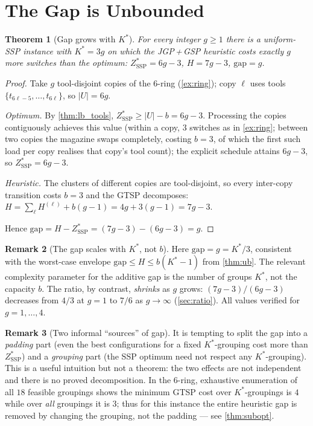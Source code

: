 \documentclass[11pt,a4paper]{article}
\theoremstyle{plain}
\newtheorem{theorem}{Theorem}[section]
\theoremstyle{definition}
\newtheorem{remark}[theorem]{Remark}
\newcommand{\Kstar}{K^{*}}
\newcommand{\ZSSP}{Z_{\mathrm{SSP}}^{*}}
\begin{document}
\section{The Gap is Unbounded}
\label{sec:gap_growth}

\begin{thmbox}
\begin{theorem}[Gap grows with $\Kstar$]
\label{thm:unbounded}
For every integer $g\ge 1$ there is a uniform-SSP instance with $\Kstar=3g$ on which the
JGP\,+\,GSP heuristic costs exactly $g$ more switches than the optimum:
$\ZSSP=6g-3$, $H=7g-3$, $\mathrm{gap}=g$.
\end{theorem}
\end{thmbox}
\begin{proofbox}
\begin{proof}
Take $g$ tool-disjoint copies of the $6$-ring (\cref{ex:ring}); copy $\ell$ uses tools
$\{t_{6\ell-5},\dots,t_{6\ell}\}$, so $|U|=6g$.

\emph{Optimum.} By \cref{thm:lb_tools}, $\ZSSP\ge|U|-b=6g-3$. Processing the copies
contiguously achieves this value (within a copy, $3$ switches as in \cref{ex:ring};
between two copies the magazine swaps completely, costing $b=3$, of which the first such
load per copy realises that copy's tool count); the explicit schedule attains $6g-3$, so
$\ZSSP=6g-3$.

\emph{Heuristic.} The clusters of different copies are tool-disjoint, so every
inter-copy transition costs $b=3$ and the GTSP decomposes: $H=\sum_{\ell}H^{(\ell)}+b(g-1)
=4g+3(g-1)=7g-3$.

Hence $\mathrm{gap}=H-\ZSSP=(7g-3)-(6g-3)=g$.
\end{proof}
\end{proofbox}

\begin{remark}[The gap scales with $\Kstar$, not $b$]
Here $\mathrm{gap}=g=\Kstar/3$, consistent with the worst-case envelope
$\mathrm{gap}\le H\le b(\Kstar-1)$ from \cref{thm:ub}. The relevant complexity
parameter for the additive gap is the number of groups $\Kstar$, not the capacity $b$.
The ratio, by contrast, \emph{shrinks} as $g$ grows: $(7g-3)/(6g-3)$ decreases from
$4/3$ at $g=1$ to $7/6$ as $g\to\infty$ (\cref{sec:ratio}). All values verified for
$g=1,\dots,4$.
\end{remark}

\begin{remark}[Two informal ``sources'' of gap]
\label{rem:sources}
It is tempting to split the gap into a \emph{padding} part (even the best configurations
for a fixed $\Kstar$-grouping cost more than $\ZSSP$) and a \emph{grouping} part (the SSP
optimum need not respect any $\Kstar$-grouping). This is a useful intuition but not a
theorem: the two effects are not independent and there is no proved decomposition. In the
$6$-ring, exhaustive enumeration of all $18$ feasible groupings shows the minimum GTSP
cost over $\Kstar$-groupings is $4$ while over \emph{all} groupings it is $3$; thus for
this instance the entire heuristic gap is removed by changing the grouping, not the
padding --- see \cref{thm:subopt}.
\end{remark}
\end{document}
